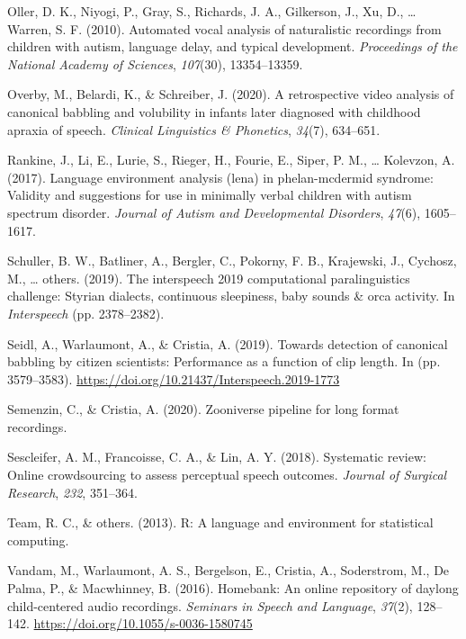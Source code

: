 \documentclass[english,,man,floatsintext]{apa6}
\begin{document}
\leavevmode\hypertarget{ref-oller2010automated}{}%
Oller, D. K., Niyogi, P., Gray, S., Richards, J. A., Gilkerson, J., Xu, D., \ldots{} Warren, S. F. (2010). Automated vocal analysis of naturalistic recordings from children with autism, language delay, and typical development. \emph{Proceedings of the National Academy of Sciences}, \emph{107}(30), 13354--13359.

\leavevmode\hypertarget{ref-overby2020retrospective}{}%
Overby, M., Belardi, K., \& Schreiber, J. (2020). A retrospective video analysis of canonical babbling and volubility in infants later diagnosed with childhood apraxia of speech. \emph{Clinical Linguistics \& Phonetics}, \emph{34}(7), 634--651.

\leavevmode\hypertarget{ref-rankine2017language}{}%
Rankine, J., Li, E., Lurie, S., Rieger, H., Fourie, E., Siper, P. M., \ldots{} Kolevzon, A. (2017). Language environment analysis (lena) in phelan-mcdermid syndrome: Validity and suggestions for use in minimally verbal children with autism spectrum disorder. \emph{Journal of Autism and Developmental Disorders}, \emph{47}(6), 1605--1617.

\leavevmode\hypertarget{ref-schuller2019interspeech}{}%
Schuller, B. W., Batliner, A., Bergler, C., Pokorny, F. B., Krajewski, J., Cychosz, M., \ldots{} others. (2019). The interspeech 2019 computational paralinguistics challenge: Styrian dialects, continuous sleepiness, baby sounds \& orca activity. In \emph{Interspeech} (pp. 2378--2382).

\leavevmode\hypertarget{ref-Seidl19}{}%
Seidl, A., Warlaumont, A., \& Cristia, A. (2019). Towards detection of canonical babbling by citizen scientists: Performance as a function of clip length. In (pp. 3579--3583). \url{https://doi.org/10.21437/Interspeech.2019-1773}

\leavevmode\hypertarget{ref-semenzin2020zooniverse}{}%
Semenzin, C., \& Cristia, A. (2020). Zooniverse pipeline for long format recordings.

\leavevmode\hypertarget{ref-sescleifer2018systematic}{}%
Sescleifer, A. M., Francoisse, C. A., \& Lin, A. Y. (2018). Systematic review: Online crowdsourcing to assess perceptual speech outcomes. \emph{Journal of Surgical Research}, \emph{232}, 351--364.

\leavevmode\hypertarget{ref-team2013r}{}%
Team, R. C., \& others. (2013). R: A language and environment for statistical computing.

\leavevmode\hypertarget{ref-vandam2016homebank}{}%
Vandam, M., Warlaumont, A. S., Bergelson, E., Cristia, A., Soderstrom, M., De Palma, P., \& Macwhinney, B. (2016). Homebank: An online repository of daylong child-centered audio recordings. \emph{Seminars in Speech and Language}, \emph{37}(2), 128--142. \url{https://doi.org/10.1055/s-0036-1580745}
\end{document}
